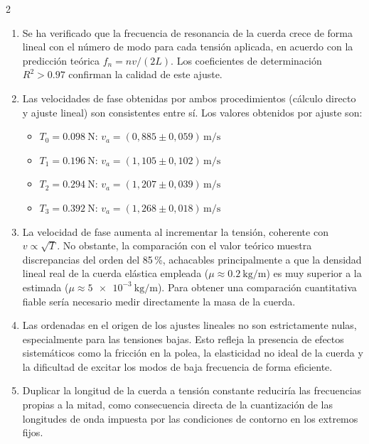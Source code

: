 \documentclass[12pt,a4paper]{article}
\begin{document}
\begin{multicols}{2}
\begin{enumerate}
  \item Se ha verificado que la frecuencia de resonancia de la cuerda crece de forma lineal con el número de modo para cada tensión aplicada, en acuerdo con la predicción teórica $f_n = nv/(2L)$. Los coeficientes de determinación $R^2 > 0.97$ confirman la calidad de este ajuste.

  \item Las velocidades de fase obtenidas por ambos procedimientos (cálculo directo y ajuste lineal) son consistentes entre sí. Los valores obtenidos por ajuste son:
  \begin{itemize}
    \item $T_0 = \SI{0.098}{\newton}$: $v_a = (0{,}885 \pm 0{,}059)\,\si{\metre\per\second}$
    \item $T_1 = \SI{0.196}{\newton}$: $v_a = (1{,}105 \pm 0{,}102)\,\si{\metre\per\second}$
    \item $T_2 = \SI{0.294}{\newton}$: $v_a = (1{,}207 \pm 0{,}039)\,\si{\metre\per\second}$
    \item $T_3 = \SI{0.392}{\newton}$: $v_a = (1{,}268 \pm 0{,}018)\,\si{\metre\per\second}$
  \end{itemize}

  \item La velocidad de fase aumenta al incrementar la tensión, coherente con $v \propto \sqrt{T}$. No obstante, la comparación con el valor teórico muestra discrepancias del orden del 85\,\%, achacables principalmente a que la densidad lineal real de la cuerda elástica empleada ($\mu \approx \SI{0.2}{\kilogram\per\metre}$) es muy superior a la estimada ($\mu \approx \SI{5e-3}{\kilogram\per\metre}$). Para obtener una comparación cuantitativa fiable sería necesario medir directamente la masa de la cuerda.

  \item Las ordenadas en el origen de los ajustes lineales no son estrictamente nulas, especialmente para las tensiones bajas. Esto refleja la presencia de efectos sistemáticos como la fricción en la polea, la elasticidad no ideal de la cuerda y la dificultad de excitar los modos de baja frecuencia de forma eficiente.

  \item Duplicar la longitud de la cuerda a tensión constante reduciría las frecuencias propias a la mitad, como consecuencia directa de la cuantización de las longitudes de onda impuesta por las condiciones de contorno en los extremos fijos.
\end{enumerate}

\end{multicols}

\printbibliography
\end{document}
